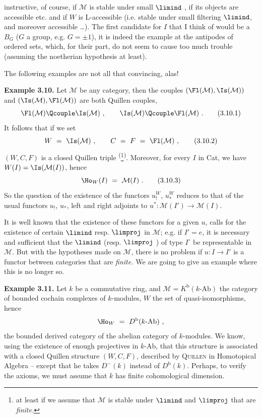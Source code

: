 instructive, of course, if $\mathcal{M}$ is stable under small $\limind$ , if its objects are accessible etc. and if $W$ is L-accessible (i.e. stable under small filtering $\limind$, and moreover accessible \dots). The first candidate for $I$ that I think of would be a $B_G$ ($G$ a group, e.g. $G=\pm1$), it is indeed the example at the antipodes of ordered sets, which, for their part, do not seem to cause too much trouble (assuming the noetherian hypothesis at least).

The following examples are not all that convincing, alas!

\textbf{Example 3.10.} Let $\mathcal{M}$ be any category, then the couples $(\Fl(\mathcal{M}),\Is(\mathcal{M}))$ and $(\Is(\mathcal{M}),\Fl(\mathcal{M}))$ are both Quillen couples,
\[
\Fl(\mathcal{M}) \Qcouple \Is(\mathcal{M}) \ , \qquad \Is(\mathcal{M}) \Qcouple \Fl(\mathcal{M}) \ . \tag*{(3.10.1)} %
\]
It follows that if we set
\[
W \ = \ \Is(\mathcal{M}) \ , \qquad C \ = \ F \ = \ \Fl(\mathcal{M}) \ , \tag*{(3.10.2)}
\]
$(W,C,F)$ is a closed Quillen triple \textsuperscript{(}\footnote[22]{at least if we assume that $\mathcal{M}$ is stable under $\limind$ and $\limproj$ that are \textit{finite.}}\textsuperscript{)}. Moreover, for every $I$ in Cat, we have $W(I)=\Is(\mathcal{M}(I))$, hence
\[
\Ho_W(I) \ = \ \mathcal{M}(I) \ . \tag*{(3.10.3)}
\]
So the question of the existence of the functors $u_!^W$, $u_*^W$ reduces to that of the usual functors $u_!$, $u_*$, left and right adjoints to $u^* : \mathcal{M}(I') \longrightarrow \mathcal{M}(I)$.

It is well known that the existence of these functors for a given $u$, calls for the existence of certain $\limind$ resp. $\limproj$ in $\mathcal{M}$; e.g. if $I'=e$, it is necessary and sufficient that the $\limind$ (resp. $\limproj$ ) of type $I^\circ$ be representable in $\mathcal{M}$. But with the hypotheses made on $\mathcal{M}$, there is no problem if $u : I \longrightarrow I'$ is a functor between categories that are \textit{finite.} We are going to give an example where this is no longer so.

\textbf{Example 3.11.} Let $k$ be a commutative ring, and $\mathcal{M}=K^{\mathrm{b}}(k\text{-Ab})$ the category of bounded cochain complexes of $k$-modules, $W$ the set of quasi-isomorphisms, hence
\[
\Ho_W \ = \ D^{\mathrm{b}}(k\text{-Ab}) \ ,
\]
the bounded derived category of the abelian category of $k$-modules. We know, using the existence of enough projectives in $k$-Ab, that this structure is associated with a closed Quillen structure $(W,C,F)$, described by \textsc{Quillen}
in Homotopical Algebra -- except that he takes $D^-(k)$ instead of $D^{\mathrm{b}}(k)$. Perhaps, to verify the axioms, we must assume that $k$ has finite cohomological dimension.

